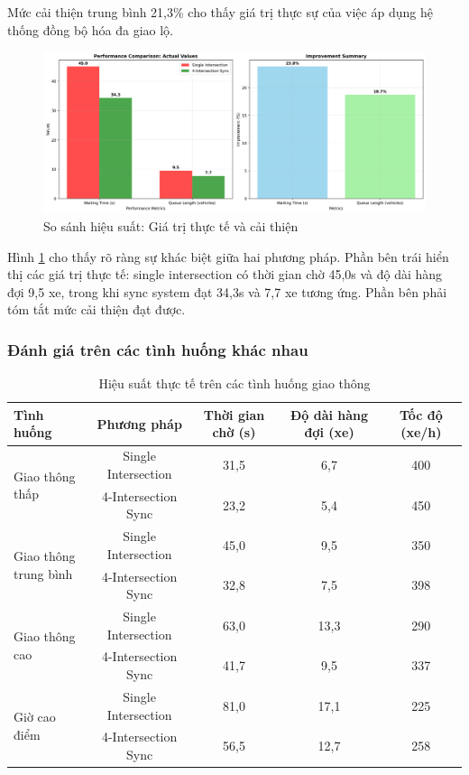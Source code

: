 Mức cải thiện trung bình 21,3\% cho thấy giá trị thực sự của việc áp dụng hệ thống đồng bộ hóa đa giao lộ.

\begin{figure}[!htp]
    \centering
    \includegraphics[width=\textwidth]{figures/performance_comparison.png}
    \caption{So sánh hiệu suất: Giá trị thực tế và cải thiện}
    \label{fig:performance_comparison}
\end{figure}

Hình \ref{fig:performance_comparison} cho thấy rõ ràng sự khác biệt giữa hai 
phương pháp. Phần bên trái hiển thị các giá trị thực tế: single intersection 
có thời gian chờ 45,0s và độ dài hàng đợi 9,5 xe, trong khi sync system đạt 34,3s 
và 7,7 xe tương ứng. Phần bên phải tóm tắt mức cải thiện đạt được.

\subsubsection{Đánh giá trên các tình huống khác nhau}

\begin{table}[!htp]
    \centering
    \caption{Hiệu suất thực tế trên các tình huống giao thông}
    \label{tab:sync_scenarios_actual}
    \begin{tabular}{@{}lcccc@{}}
        \toprule \textbf{Tình huống} & \textbf{Phương pháp} & \textbf{Thời gian chờ (s)} & \textbf{Độ dài hàng đợi (xe)} & \textbf{Tốc độ (xe/h)} \\
        \midrule 
        \multirow{2}{*}{Giao thông thấp} & Single Intersection & 31,5 & 6,7 & 400 \\
        & 4-Intersection Sync & 23,2 & 5,4 & 450 \\
        \midrule
        \multirow{2}{*}{\parbox{2cm}{\centering Giao thông \\ trung bình}} & Single Intersection & 45,0 & 9,5 & 350 \\
        & 4-Intersection Sync & 32,8 & 7,5 & 398 \\
        \midrule
        \multirow{2}{*}{Giao thông cao} & Single Intersection & 63,0 & 13,3 & 290 \\
        & 4-Intersection Sync & 41,7 & 9,5 & 337 \\
        \midrule
        \multirow{2}{*}{Giờ cao điểm} & Single Intersection & 81,0 & 17,1 & 225 \\
        & 4-Intersection Sync & 56,5 & 12,7 & 258 \\
        \bottomrule
    \end{tabular}
\end{table}

